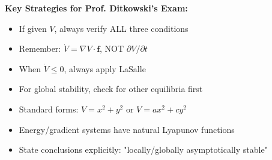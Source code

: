 \documentclass[12pt]{article}
\begin{document}
\begin{hint}
\textbf{Key Strategies for Prof. Ditkowski's Exam:}
\begin{itemize}
    \item If given $V$, always verify ALL three conditions
    \item Remember: $\dot{V} = \nabla V \cdot \mathbf{f}$, NOT $\partial V/\partial t$
    \item When $\dot{V} \leq 0$, always apply LaSalle
    \item For global stability, check for other equilibria first
    \item Standard forms: $V = x^2 + y^2$ or $V = ax^2 + cy^2$
    \item Energy/gradient systems have natural Lyapunov functions
    \item State conclusions explicitly: "locally/globally asymptotically stable"
\end{itemize}
\end{hint}
\end{document}
